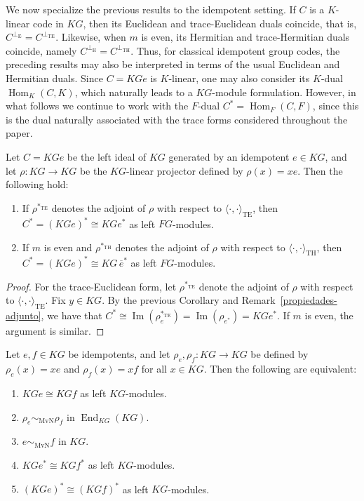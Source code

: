 \documentclass[11pt]{article}
\begin{document}
We now specialize the previous results to the idempotent setting. If $C$ is a $K$-linear code in $KG$, then its Euclidean and trace-Euclidean duals coincide, that is, $C^{\perp_{\mathrm E}}=C^{\perp_{\mathrm{TE}}}$. Likewise, when $m$ is even, its Hermitian and trace-Hermitian duals coincide, namely $C^{\perp_{\mathrm H}}=C^{\perp_{\mathrm{TH}}}$. Thus, for classical idempotent group codes, the preceding results may also be interpreted in terms of the usual Euclidean and Hermitian duals. Since $C=KGe$ is $K$-linear, one may also consider its $K$-dual $\operatorname{Hom}_K(C,K)$, which naturally leads to a $KG$-module formulation. However, in what follows we continue to work with the $F$-dual $C^*=\operatorname{Hom}_F(C,F)$, since this is the dual naturally associated with the trace forms considered throughout the paper.

\begin{corollary}\label{pre-coro}
Let $C=KGe$ be the left ideal of $KG$ generated by an idempotent $e\in KG$, and let $\rho:KG\longrightarrow KG$ be the $KG$-linear projector defined by $\rho(x)=xe$. Then the following hold:
\begin{enumerate}
    \item If $\rho^{\ast_{\mathrm{TE}}}$ denotes the adjoint of $\rho$ with respect to $\langle\cdot,\cdot\rangle_{\mathrm{TE}}$, then $C^*=(KG e)^\ast \cong KGe^\ast$ as left $FG$-modules.

    \item If $m$ is even and $\rho^{\ast_{\mathrm{TH}}}$ denotes the adjoint of $\rho$ with respect to $\langle\cdot,\cdot\rangle_{\mathrm{TH}}$, then $C^*=(KG e)^\ast\cong KG\,\overline e^\ast$ as left $FG$-modules.
\end{enumerate}
\end{corollary}

\begin{proof}
For the trace-Euclidean form, let $\rho^{\ast_{\mathrm{TE}}}$ denote the adjoint of $\rho$ with respect to $\langle\cdot,\cdot\rangle_{\mathrm{TE}}$. Fix $y\in KG$. By the previous Corollary and Remark~\ref{propiedades-adjunto}, we have that
$C^* \cong \operatorname{Im}(\rho_e^{\ast_{\mathrm{TE}}}) = \operatorname{Im}(\rho_{e^{\ast}}) = KGe^{\ast}.$
If $m$ is even, the argument is similar.
\end{proof}

\begin{corollary}
Let $e,f\in KG$ be idempotents, and let $\rho_e,\rho_f:KG\longrightarrow KG$ be defined by $\rho_e(x)=xe$ and $\rho_f(x)=xf$ for all $x\in KG$. Then the following are equivalent:
\begin{enumerate}
    \item $KGe\cong KGf$ as left $KG$-modules.
    \item $\rho_e\sim_{\mathrm{MvN}}\rho_f$ in $\operatorname{End}_{KG}(KG)$.
    \item $e\sim_{\mathrm{MvN}}f$ in $KG$.
    \item $KGe^\ast\cong KGf^\ast$ as left $KG$-modules.
    \item $(KGe)^*\cong(KGf)^*$ as left $KG$-modules.
\end{enumerate}
\end{corollary}
\end{document}
